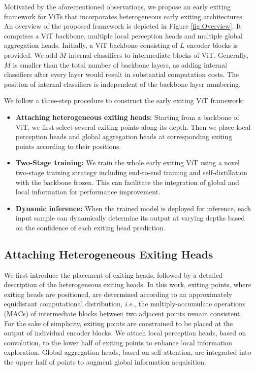 Motivated by the aforementioned observations, we propose an early exiting framework for ViTs that incorporates heterogeneous early exiting architectures.
An overview of the proposed framework is depicted in Figure \ref{fig:Overview}. 
It comprises a ViT backbone, multiple local perception heads and multiple global aggregation heads. 
Initially, a ViT backbone consisting of $L$ encoder blocks is provided. We add $M$ internal classifiers to intermediate blocks of ViT. 
Generally, $M$ is smaller than the total number of backbone layers, as adding internal classifiers after every layer would result in substantial computation costs. 
The position of internal classifiers is independent of the backbone layer numbering. 

We follow a three-step procedure to construct the early exiting ViT framework: 
\begin{itemize}
  \item \textbf{Attaching heterogeneous exiting heads:} Starting from a backbone of ViT, 
  we first select several exiting points along its depth. Then we place local perception heads and global aggregation heads at corresponding exiting points according to their positions. 
  \item \textbf{Two-Stage training:} We train the whole early exiting ViT using a novel two-stage training strategy including end-to-end training and self-distillation with the backbone frozen.  
  This can facilitate the integration of global and local information for performance improvement. 
  \item \textbf{Dynamic inference:} When the trained model is deployed for inference, 
  each input sample can dynamically determine its output at varying depths based on the confidence of each exiting head prediction. 
\end{itemize}

\subsection{Attaching Heterogeneous Exiting Heads}
We first introduce the placement of exiting heads, followed by a detailed description of the heterogeneous exiting heads. 
In this work, exiting points, where exiting heads are positioned, are determined according to an approximately equidistant computational distribution, 
\textit{i.e.}, the multiply-accumulate operations (MACs) of intermediate blocks between two adjacent points remain consistent. 
For the sake of simplicity, exiting points are constrained to be placed at the output of individual encoder blocks.
We attach local perception heads, based on convolution, to the lower half of exiting points to enhance local information exploration. 
Global aggregation heads, based on self-attention, are integrated into the upper half of points to augment global information acquisition. 

